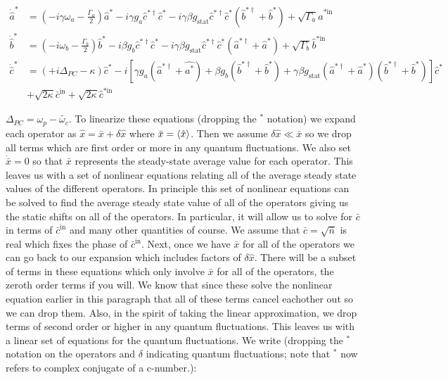 \documentclass[12pt]{article}
\begin{document}
\begin{align}
\dot{\hat{a}}^* &= \left(-i \gamma \omega_a-\frac{\Gamma_a}{2}\right)\hat{a}^* - i \gamma g_a \hat{c}^{*\dag}\hat{c}^* - i \gamma \beta g_{\text{stat}} \hat{c}^{*\dag}\hat{c}^*(\hat{b}^{*\dag}+\hat{b}^*) + \sqrt{\Gamma_a}\hat{a}^{*\text{in}}\\
\dot{\hat{b}}^* &= \left(-i \omega_b - \frac{\Gamma_b}{2}\right)\hat{b}^* -i \beta g_b \hat{c}^{*\dag}\hat{c}^* - i \gamma \beta g_{\text{stat}} \hat{c}^{*\dag}\hat{c}^*(\hat{a}^{*\dag}+\hat{a}^*) + \sqrt{\Gamma_b}\hat{b}^{*\text{in}}\\
\dot{\hat{c}}^* &= \left(+i \Delta_{PC} -\kappa\right)\hat{c}^* - i\left[\gamma g_a (\hat{a}^{*\dag}+\hat{a^*})+ \beta g_b (\hat{b}^{*\dag} + \hat{b}^*)+ \gamma \beta g_{\text{stat}}(\hat{a}^{*\dag}+\hat{a}^*)(\hat{b}^{*\dag}+\hat{b}^*)\right]\hat{c}^*\\
&+\sqrt{2\kappa}\bar{c}^{\text{in}} + \sqrt{2\kappa}\hat{c}^{*\text{in}}
\end{align}

$\Delta_{PC} = \omega_p-\tilde{\omega_c}$. To linearize these equations (dropping the $^*$ notation) we expand each operator as $\hat{x} = \bar{x}+\delta \hat{x}$ where $\bar{x} = \braket{\hat{x}}$. Then we assume $\delta \hat{x}\ll\bar{x}$ so we drop all terms which are first order or more in any quantum fluctuations. We also set $\dot{\bar{x}}=0$ so that $\bar{x}$ represents the steady-state average value for each operator. This leaves us with a set of nonlinear equations relating all of the average steady state values of the different operators. In principle this set of nonlinear equations can be solved to find the average steady state value of all of the operators giving us the static shifts on all of the operators. In particular, it will allow us to solve for $\bar{c}$ in terms of $\bar{c}^{\text{in}}$ and many other quantities of course. We assume that $\bar{c}=\sqrt{\bar{n}}$ is real which fixes the phase of $\bar{c}^{\text{in}}$.
Next, once we have $\bar{x}$ for all of the operators we can go back to our expansion which includes factors of $\delta \hat{x}$. There will be a subset of terms in these equations which only involve $\bar{x}$ for all of the operators, the zeroth order terms if you will. We know that since these solve the nonlinear equation earlier in this paragraph that all of these terms cancel eachother out so we can drop them. Also, in the spirit of taking the linear approximation, we drop terms of second order or higher in any quantum fluctuations. This leaves us with a linear set of equations for the quantum fluctuations. We write (dropping the $^*$ notation on the operators and $\delta$ indicating quantum fluctuations; note that $^*$ now refers to complex conjugate of a c-number.):
\end{document}
